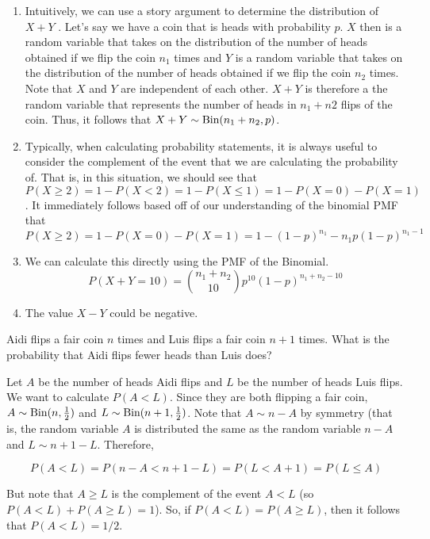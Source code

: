 \documentclass[11pt]{article}
\begin{document}
\begin{solution}
\begin{enumerate}
\item Intuitively, we can use a story argument to determine the distribution of $X + Y$ . Let’s say we have a coin
that is heads with probability $p$. $X$ then is a random variable that takes on the distribution of the number
of heads obtained if we flip the coin $n_1$ times and $Y$ is a random variable that takes on the distribution of
the number of heads obtained if we flip the coin $n_2$ times. Note that $X$ and $Y$ are independent of each other.
$X + Y$ is therefore a the random variable that represents the number of heads in $n_1 + n 2$ flips of the coin. Thus,
it follows that $X + Y \sim \textrm{Bin}(n_1 + n_2 , p)$.
\item Typically, when calculating probability statements, it is always useful to consider the complement of the
event that we are calculating the probability of. That is, in this situation, we should see that
$$P (X \geq 2) = 1-P (X < 2) = 1-P (X \leq 1) = 1-P (X = 0)-P (X = 1)$$. It immediately follows based off
of our understanding of the binomial PMF that
$$P (X \geq 2) = 1-P (X = 0)-P (X = 1) = 1-(1-p)^{n_1}-n_1p(1-p)^{n_1 - 1}$$
\item We can calculate this directly using the PMF of the Binomial.
$$
P(X+Y=10) = {n_1 + n_2 \choose 10}p^{10}(1-p)^{n_1+n_2-10}
$$
\item The value $X - Y$ could be negative.
\end{enumerate}
\end{solution}


\begin{exercise}
Aidi flips a fair coin $n$ times and Luis flips a fair coin $n+1$ times. What is the probability that Aidi flips fewer heads than Luis does?
\end{exercise}
\begin{solution}
Let $A$ be the number of heads Aidi flips and $L$ be the number of heads Luis flips. We want to calculate $P (A < L)$. Since they are both flipping a fair coin, $A \sim \textrm{Bin}(n, \frac{1}{2})$ and $L \sim \textrm{Bin}(n + 1, \frac{1}{2})$. Note that $A \sim n - A$ by symmetry (that is, the random variable $A$ is distributed the same as the random variable $n-A$ and $L \sim n+1-L$. Therefore,

$$P(A < L) = P(n - A < n + 1 - L) = P(L < A + 1) = P(L \leq A)$$

But note that $A \ge L$ is the complement of the event $A < L$ (so $P(A<L)+P(A \ge L) =1$). So, if $P(A < L) = P(A \ge L)$, then it follows that $P(A < L) = 1/2$.

\end{solution}
\end{document}
